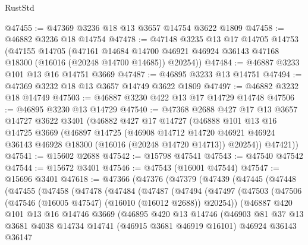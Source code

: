 \begin{lexlean}{RustStd}
\begin{coremodule}
@47455 := @47369 @3236 @18 @13 @3657 @14754 @3622 @1809
@47458 := @46882 @3236 @18 @14754
@47478 := @47148
    @3235
    @13
    @17
    @14705
    @14753
    (@47155
      @14705
      (@47161
        @14684
        @14700
        @46921
        @46924
        @36143
        @47168
        @18300
        (@16016 (@20248 @14700 @14685))
        @20254))
@47484 := @46887 @3233 @101 @13 @16 @14751 @3669
@47487 := @46895 @3233 @13 @14751
@47494 := @47369 @3232 @18 @13 @3657 @14749 @3622 @1809
@47497 := @46882 @3232 @18 @14749
@47503 := @46887 @3230 @422 @13 @17 @14729 @14748
@47506 := @46895 @3230 @13 @14729
@47540 := @47368
    @2688
    @427
    @17
    @13
    @3657
    @14727
    @3622
    @3401
    (@46882
      @427
      @17
      @14727
      (@46888
        @101
        @13
        @16
        @14725
        @3669
        (@46897
          @14725
          (@46908
            @14712
            @14720
            @46921
            @46924
            @36143
            @46928
            @18300
            (@16016 (@20248 @14720 @14713))
            @20254))
        @47421))
@47541 := @15602 @2688
@47542 := @15798 @47541
@47543 := @47540 @47542
@47544 := @15672 @3401
@47546 := @47543 (@16001 @47544)
@47547 := @15696 @3401
@47618 := @47366
    (@47376
      (@47379
        (@47439
          (@47445
            (@47448
              (@47455
                (@47458
                  (@47478
                    (@47484
                      (@47487
                        (@47494
                          (@47497
                            (@47503
                              (@47506 (@47546 (@16005 @47547) (@16010 (@16012 @2688)) @20254))
                              (@46887
                                @420
                                @101
                                @13
                                @16
                                @14746
                                @3669
                                (@46895
                                  @420
                                  @13
                                  @14746
                                  (@46903
                                    @81
                                    @37
                                    @13
                                    @3681
                                    @4038
                                    @14734
                                    @14741
                                    (@46915 @3681 @46919 @16101)
                                    @46924
                                    @36143
                                    @36147

\end{coremodule}
\end{lexlean}
